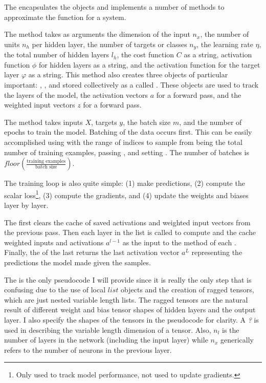 \documentclass{article}
\begin{document}
The  encapsulates the  objects and
implements a number of methods to approximate the function for a system.

The  method takes as arguments the dimension of the input
$n_x$, the number of units $n_h$ per hidden layer, the number of targets or
classes $n_y$, the learning rate $\eta$, the total number of hidden layers $l_h$,
the cost function $C$ as a string, activation function $\phi$ for hidden layers as a string,
and the activation function for the target layer $\varphi$ as a string. This method
also creates three  objects of particular important:
, , and
 stored collectively as a 
called . These  objects are used to
track the layers of the model, the activation vectors $a$ for a forward pass,
and the weighted input vectors $z$ for a forward pass.

The  method takes inputs $X$, targets $y$, the batch size $m$,
and the number of epochs to train the model. Batching of the data occurs first.
This can be easily accomplished using  with
the range of indices to sample from being the total number of training examples,
passing , and setting .
The number of batches is $floor(\frac{\text{training examples}}{\text{batch size}})$.

The training loop is also quite simple: (1) make predictions, (2) compute the scalar
loss\footnote{Only used to track model performance, not used to
	update gradients.},
(3) compute the gradients, and (4) update the weights and biases layer by layer.

The  first clears the cache of saved activations and
weighted input vectors from the previous pass. Then each layer in the
 list is called to compute and the cache weighted inputs and
activations $a^{l-1}$ as the input to the  method of each .
Finally, the  of the last  returns the
last activation vector $a^{L}$ representing the predictions the model made given the samples.

The  is the only pseudocode I will provide since
it is really the only step that is confusing due to the use of local $list$
objects and the creation of ragged tensors, which are just nested variable
length lists. The ragged tensors are the natural result of different weight
and bias tensor shapes of hidden layers and the output layer. I also specify the
shapes of the tensors in the pseudocode for clarity. A \textit{?} is used in
describing the variable length dimension of a tensor. Also, $n_l$ is the number
of layers in the network (including the input layer) while $n_x$ generically
refers to the number of neurons in the previous layer.
\end{document}
